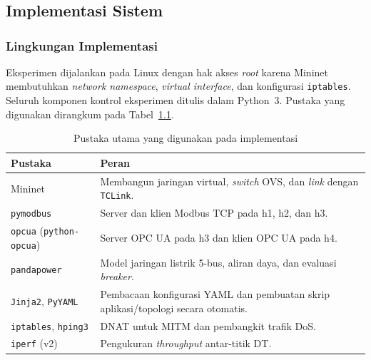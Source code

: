 \chapter{\babEmpat}
\label{cha:Pengujian dan Evaluasi}

\section{Implementasi Sistem}
\label{sec:implementasi_sistem}

\subsection{Lingkungan Implementasi}
\label{subsec:lingkungan_implementasi}
Eksperimen dijalankan pada Linux dengan hak akses \textit{root} karena Mininet membutuhkan \textit{network namespace}, \textit{virtual interface}, dan konfigurasi \texttt{iptables}. Seluruh komponen kontrol eksperimen ditulis dalam Python~3. Pustaka yang digunakan dirangkum pada Tabel~\ref{tab:lingkungan_pustaka}.

\renewcommand{\arraystretch}{1.3}
\begin{table}[htbp]
    \centering
    \caption{Pustaka utama yang digunakan pada implementasi}
    \label{tab:lingkungan_pustaka}
    \begin{tabular}{|l|p{8.5cm}|}
        \hline
        \textbf{Pustaka} & \textbf{Peran} \\ \hline
        Mininet & Membangun jaringan virtual, \textit{switch} OVS, dan \textit{link} dengan \texttt{TCLink}. \\ \hline
        \texttt{pymodbus} & Server dan klien Modbus TCP pada h1, h2, dan h3. \\ \hline
        \texttt{opcua} (\texttt{python-opcua}) & Server OPC UA pada h3 dan klien OPC UA pada h4. \\ \hline
        \texttt{pandapower} & Model jaringan listrik 5-bus, aliran daya, dan evaluasi \textit{breaker}. \\ \hline
        \texttt{Jinja2}, \texttt{PyYAML} & Pembacaan konfigurasi YAML dan pembuatan skrip aplikasi/topologi secara otomatis. \\ \hline
        \texttt{iptables}, \texttt{hping3} & \ac{DNAT} untuk \ac{MITM} dan pembangkit trafik \ac{DoS}. \\ \hline
        \texttt{iperf} (v2) & Pengukuran \textit{throughput} antar-titik \ac{DT}. \\ \hline
    \end{tabular}
\end{table}

